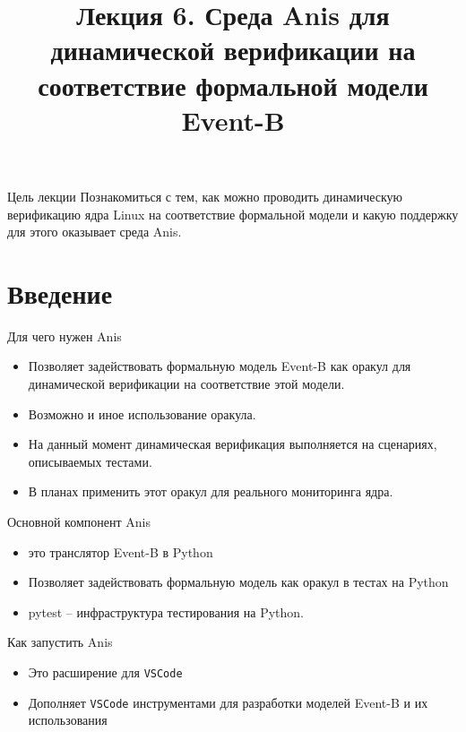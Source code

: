 \documentclass[hyperref={unicode=true}]{beamer}
\title{Лекция 6. Среда Anis для динамической верификации на соответствие формальной модели Event-B}
\author{}
\date{}
\begin{document}
	\begin{frame}{}
		\titlepage
	\end{frame}

    \begin{frame}{Цель лекции}
    Познакомиться с тем, как можно проводить динамическую верификацию
    ядра Linux на соответствие формальной модели и какую поддержку
    для этого оказывает среда Anis.
    \end{frame}

    \section{Введение}

	\begin{frame}{Для чего нужен Anis}
    \begin{itemize}
    \item Позволяет задействовать формальную модель
            Event-B как оракул для динамической верификации
            на соответствие этой модели.
    \item Возможно и иное использование оракула.
    \item На данный момент динамическая верификация выполняется
            на сценариях, описываемых тестами.
    \item В планах применить этот оракул для реального
            мониторинга ядра.
	\end{itemize}
    \end{frame}

    \begin{frame}{Основной компонент Anis}
    \begin{itemize}
    \item это транслятор Event-B в Python
    \item Позволяет задействовать формальную модель
            как оракул в тестах на Python
    \item pytest -- инфраструктура тестирования на Python.
    \end{itemize}
    \end{frame}

    \begin{frame}{Как запустить Anis}
    \begin{itemize}
    \item Это расширение для \texttt{VSCode}
    \item Дополняет \texttt{VSCode} инструментами для
        разработки моделей Event-B и их использования
    \end{itemize}
    \end{frame}
\end{document}
